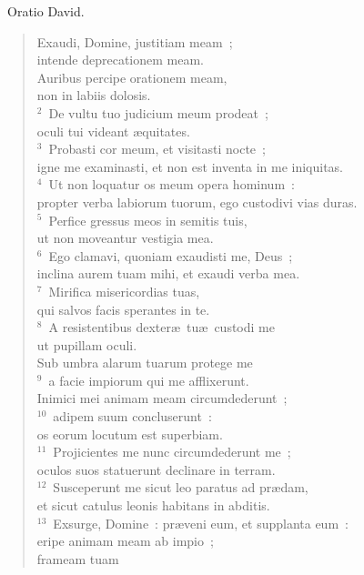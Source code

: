 ~\lettrine[lines=10,image=true,loversize=0.05,lraise=-0.03]{O}{}ratio David. \begin{flushleft}\begin{verse}\vspace{6pt}Exaudi, Domine, justitiam meam~;\\ intende deprecationem meam.\\ Auribus percipe orationem meam,\\ non in labiis dolosis.\\
${}^{2}$~De vultu tuo judicium meum prodeat~;\\ oculi tui videant \ae quitates.\\
${}^{3}$~Probasti cor meum, et visitasti nocte~;\\ igne me examinasti, et non est inventa in me iniquitas.\\
${}^{4}$~Ut non loquatur os meum opera hominum~:\\ propter verba labiorum tuorum, ego custodivi vias duras.\\
${}^{5}$~Perfice gressus meos in semitis tuis,\\ ut non moveantur vestigia mea.\\
${}^{6}$~Ego clamavi, quoniam exaudisti me, Deus~;\\ inclina aurem tuam mihi, et exaudi verba mea.\\
${}^{7}$~Mirifica misericordias tuas,\\ qui salvos facis sperantes in te.\\
${}^{8}$~A resistentibus dexter\ae\ tu\ae\ custodi me\\ ut pupillam oculi.\\ Sub umbra alarum tuarum protege me\\
${}^{9}$~a facie impiorum qui me afflixerunt.\\ Inimici mei animam meam circumdederunt~;\\
${}^{10}$~adipem suum concluserunt~:\\ os eorum locutum est superbiam.\\
${}^{11}$~Projicientes me nunc circumdederunt me~;\\ oculos suos statuerunt declinare in terram.\\
${}^{12}$~Susceperunt me sicut leo paratus ad pr\ae dam,\\ et sicut catulus leonis habitans in abditis.\\
${}^{13}$~Exsurge, Domine~: pr\ae veni eum, et supplanta eum~:\\ eripe animam meam ab impio~;\\ frameam tuam

\end{verse}
\end{flushleft}
